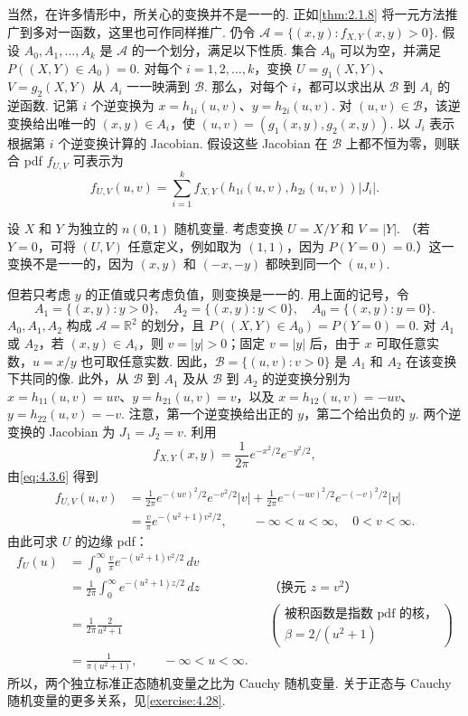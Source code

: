 当然，在许多情形中，所关心的变换并不是一一的. 正如\autoref{thm:2.1.8} 将一元方法推广到多对一函数，这里也可作同样推广. 仍令 $\mathscr A=\{(x,y):f_{X,Y}(x,y)>0\}$. 假设 $A_0,A_1,\ldots,A_k$ 是 $\mathscr A$ 的一个划分，满足以下性质. 集合 $A_0$ 可以为空，并满足 $P((X,Y)\in A_0)=0$. 对每个 $i=1,2,\ldots,k$，变换 $U=g_1(X,Y)$、$V=g_2(X,Y)$ 从 $A_i$ 一一映满到 $\mathscr B$. 那么，对每个 $i$，都可以求出从 $\mathscr B$ 到 $A_i$ 的逆函数. 记第 $i$ 个逆变换为 $x=h_{1i}(u,v)$、$y=h_{2i}(u,v)$. 对 $(u,v)\in\mathscr B$，该逆变换给出唯一的 $(x,y)\in A_i$，使 $(u,v)=(g_1(x,y),g_2(x,y))$. 以 $J_i$ 表示根据第 $i$ 个逆变换计算的 Jacobian. 假设这些 Jacobian 在 $\mathscr B$ 上都不恒为零，则联合 pdf $f_{U,V}$ 可表示为
\begin{equation}\label{eq:4.3.6}
f_{U,V}(u,v)=\sum_{i=1}^k f_{X,Y}(h_{1i}(u,v),h_{2i}(u,v))|J_i|.
\end{equation}
\begin{example}[正态变量之比的分布]\label{ex:4.3.6}
设 $X$ 和 $Y$ 为独立的 $n(0,1)$ 随机变量. 考虑变换 $U=X/Y$ 和 $V=|Y|$. （若 $Y=0$，可将 $(U,V)$ 任意定义，例如取为 $(1,1)$，因为 $P(Y=0)=0$.）这一变换不是一一的，因为 $(x,y)$ 和 $(-x,-y)$ 都映到同一个 $(u,v)$.

但若只考虑 $y$ 的正值或只考虑负值，则变换是一一的. 用上面的记号，令
$$A_1=\{(x,y):y>0\},\quad A_2=\{(x,y):y<0\},\quad A_0=\{(x,y):y=0\}.$$
$A_0,A_1,A_2$ 构成 $\mathscr A=\mathbb R^2$ 的划分，且 $P((X,Y)\in A_0)=P(Y=0)=0$. 对 $A_1$ 或 $A_2$，若 $(x,y)\in A_i$，则 $v=|y|>0$；固定 $v=|y|$ 后，由于 $x$ 可取任意实数，$u=x/y$ 也可取任意实数. 因此，$\mathscr B=\{(u,v):v>0\}$ 是 $A_1$ 和 $A_2$ 在该变换下共同的像. 此外，从 $\mathscr B$ 到 $A_1$ 及从 $\mathscr B$ 到 $A_2$ 的逆变换分别为 $x=h_{11}(u,v)=uv$、$y=h_{21}(u,v)=v$，以及 $x=h_{12}(u,v)=-uv$、$y=h_{22}(u,v)=-v$. 注意，第一个逆变换给出正的 $y$，第二个给出负的 $y$. 两个逆变换的 Jacobian 为 $J_1=J_2=v$. 利用
$$f_{X,Y}(x,y)=\frac1{2\pi}e^{-x^2/2}e^{-y^2/2},$$
由\eqref{eq:4.3.6} 得到
$$
\begin{aligned}
f_{U,V}(u,v)&=\frac1{2\pi}e^{-(uv)^2/2}e^{-v^2/2}|v|+\frac1{2\pi}e^{-(-uv)^2/2}e^{-(-v)^2/2}|v|\\
&=\frac v\pi e^{-(u^2+1)v^2/2},\qquad-\infty<u<\infty,\quad0<v<\infty.
\end{aligned}
$$
由此可求 $U$ 的边缘 pdf：
$$
\begin{aligned}
f_U(u)&=\int_0^\infty\frac v\pi e^{-(u^2+1)v^2/2}\,dv\\
&=\frac1{2\pi}\int_0^\infty e^{-(u^2+1)z/2}\,dz&&\text{（换元 $z=v^2$）}\\
&=\frac1{2\pi}\frac2{u^2+1}&&\left(\begin{gathered}\text{被积函数是指数 pdf 的核，}\\\beta=2/(u^2+1)\end{gathered}\right)\\
&=\frac1{\pi(u^2+1)},\qquad-\infty<u<\infty.
\end{aligned}
$$
所以，两个独立标准正态随机变量之比为 Cauchy 随机变量. 关于正态与 Cauchy 随机变量的更多关系，见\autoref{exercise:4.28}.
\end{example}
